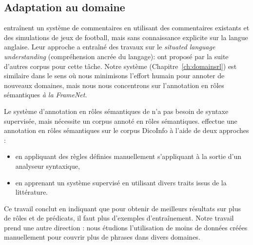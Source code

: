 \subsection{Adaptation au domaine}

\cite{chen2008learning} entraînent un système de commentaires en utilisant des
commentaires existants et des simulations de jeux de football, mais sans
connaissance explicite sur la langue anglaise. Leur approche a entraîné des
travaux sur le \textit{situated language understanding} (compréhension ancrée du
langage): \cite{bordes2010towards,richardson2012towards} ont proposé par la
suite d'autres corpus pour cette tâche. Notre système
(Chapitre~\ref{ch:domainsrl}) est similaire dans le sens où nous minimisons
l'effort humain pour annoter de nouveaux domaines, mais nous nous concentrons
sur l'annotation en rôles sémantiques \textit{à la FrameNet}.

Le système d'annotation en rôles sémantiques de \cite{gormley2014low} n'a pas
besoin de syntaxe supervisée, mais nécessite un corpus annoté en rôles
sémantiques. \cite{hadouche2011annotation} effectue une annotation en rôles
sémantiques sur le corpus DicoInfo \citep{corpusolst} à l'aide de deux
approches :

\begin{itemize}
    \item en appliquant des règles définies manuellement s'appliquant à la
        sortie d'un analyseur syntaxique,
    \item en apprenant un système supervisé en utilisant divers traits issus de
        la littérature.
\end{itemize}

Ce travail conclut en indiquant que pour obtenir de meilleurs résultats sur
plus de rôles et de prédicats, il faut plus d'exemples d'entraînement. Notre
travail prend une autre direction : nous étudions l'utilisation de moins de
données créées manuellement pour couvrir plus de phrases dans divers domaines.
